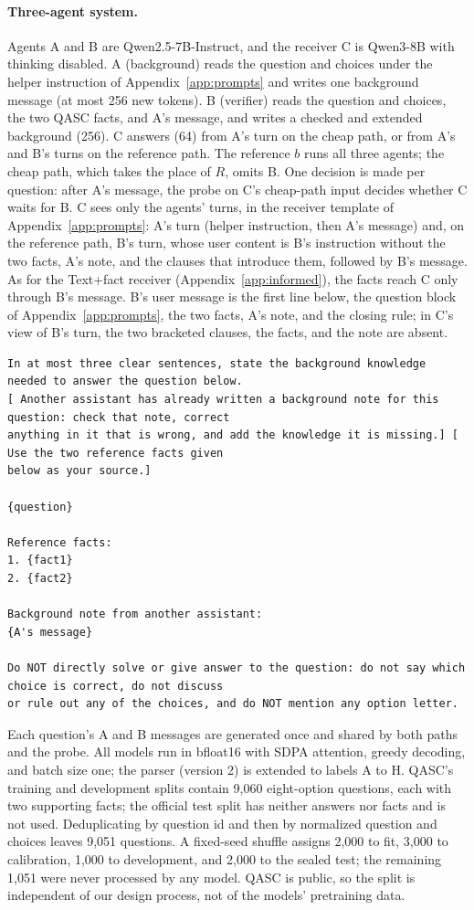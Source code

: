 \paragraph{Three-agent system.} Agents A and B are Qwen2.5-7B-Instruct, and the receiver C is Qwen3-8B with thinking disabled. A (background) reads the question and choices under the helper instruction of Appendix~\ref{app:prompts} and writes one background message (at most 256 new tokens). B (verifier) reads the question and choices, the two QASC facts, and A's message, and writes a checked and extended background (256). C answers (64) from A's turn on the cheap path, or from A's and B's turns on the reference path. The reference $b$ runs all three agents; the cheap path, which takes the place of $R$, omits B. One decision is made per question: after A's message, the probe on C's cheap-path input decides whether C waits for B. C sees only the agents' turns, in the receiver template of Appendix~\ref{app:prompts}: A's turn (helper instruction, then A's message) and, on the reference path, B's turn, whose user content is B's instruction without the two facts, A's note, and the clauses that introduce them, followed by B's message. As for the Text+fact receiver (Appendix~\ref{app:informed}), the facts reach C only through B's message. B's user message is the first line below, the question block of Appendix~\ref{app:prompts}, the two facts, A's note, and the closing rule; in C's view of B's turn, the two bracketed clauses, the facts, and the note are absent.
{\fontsize{6.3}{7.0}\selectfont
\begin{verbatim}
In at most three clear sentences, state the background knowledge needed to answer the question below.
[ Another assistant has already written a background note for this question: check that note, correct
anything in it that is wrong, and add the knowledge it is missing.] [ Use the two reference facts given
below as your source.]

{question}

Reference facts:
1. {fact1}
2. {fact2}

Background note from another assistant:
{A's message}

Do NOT directly solve or give answer to the question: do not say which choice is correct, do not discuss
or rule out any of the choices, and do NOT mention any option letter.
\end{verbatim}}
\noindent Each question's A and B messages are generated once and shared by both paths and the probe. All models run in bfloat16 with SDPA attention, greedy decoding, and batch size one; the parser (version 2) is extended to labels A to H. QASC's training and development splits contain 9,060 eight-option questions, each with two supporting facts; the official test split has neither answers nor facts and is not used. Deduplicating by question id and then by normalized question and choices leaves 9,051 questions. A fixed-seed shuffle assigns 2,000 to fit, 3,000 to calibration, 1,000 to development, and 2,000 to the sealed test; the remaining 1,051 were never processed by any model. QASC is public, so the split is independent of our design process, not of the models' pretraining data.

